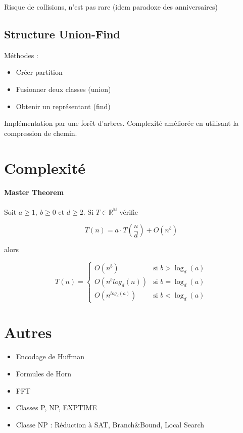 \documentclass[10pt,a4paper]{article}
\begin{document}
Risque de collisions, n'est pas rare (idem paradoxe des anniversaires)

\subsection{Structure Union-Find}

Méthodes : 
\begin{itemize}[noitemsep]
	\item Créer partition
	\item Fusionner deux classes (union)
	\item Obtenir un représentant (find)
\end{itemize}

Implémentation par une forêt d'arbres. %
Complexité améliorée en utilisant la compression de chemin.

\section{Complexité}

\paragraph{Master Theorem} Soit $a \geq 1,~b \geq 0$ et $d \geq 2$. Si $T \in \mathbb{R}^{\mathbb{N}}$ vérifie 

\[ T(n) = a \cdot T \left( \dfrac{n}{d} \right) + O \left( n^b \right) \]

\noindent alors

\[
T(n) = \left\{
    \begin{array}{ll}
        O\left( n^b \right) & \mbox{si } b > \log_d(a) \\
        O\left(n^b log_d(n)\right) & \mbox{si } b = \log_d(a) \\
        O\left( n^{log_d(a)} \right) & \mbox{si } b < \log_d(a)
    \end{array}
\right.
\]

\section{Autres}

\begin{itemize}[noitemsep]
	\item Encodage de Huffman
	\item Formules de Horn
	\item FFT
	\item Classes P, NP, EXPTIME
	\item Classe NP : Réduction à SAT, Branch\&Bound, Local Search
\end{itemize}
\end{document}
